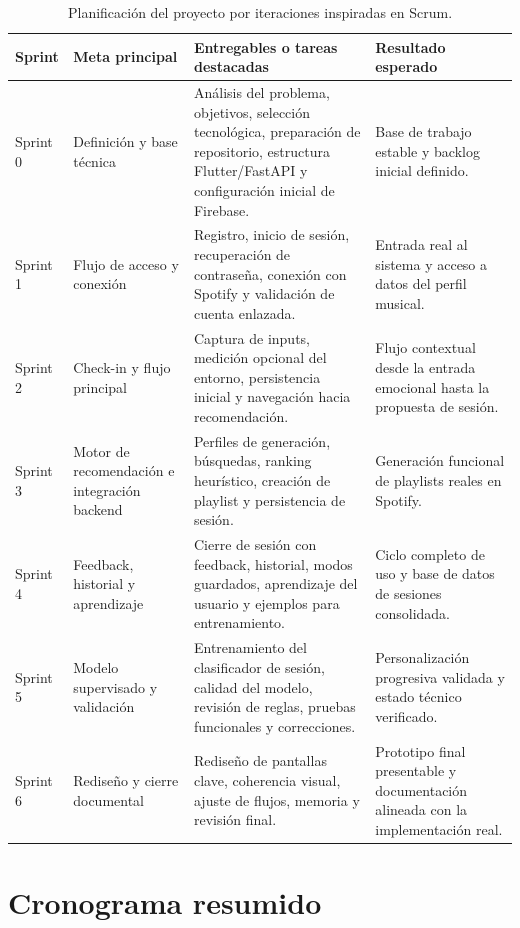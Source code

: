 \begin{table}[H]
\centering
\small
\renewcommand{\arraystretch}{1.1}
\begin{tabularx}{\textwidth}{|P{1.7cm}|P{2.4cm}|Y|P{2.7cm}|}
\hline
\textbf{Sprint} & \textbf{Meta principal} & \textbf{Entregables o tareas destacadas} & \textbf{Resultado esperado} \\
\hline
Sprint 0 & Definición y base técnica & Análisis del problema, objetivos, selección tecnológica, preparación de repositorio, estructura Flutter/FastAPI y configuración inicial de Firebase. & Base de trabajo estable y backlog inicial definido. \\
\hline
Sprint 1 & Flujo de acceso y conexión & Registro, inicio de sesión, recuperación de contraseña, conexión con Spotify y validación de cuenta enlazada. & Entrada real al sistema y acceso a datos del perfil musical. \\
\hline
Sprint 2 & Check-in y flujo principal & Captura de inputs, medición opcional del entorno, persistencia inicial y navegación hacia recomendación. & Flujo contextual desde la entrada emocional hasta la propuesta de sesión. \\
\hline
Sprint 3 & Motor de recomendación e integración backend & Perfiles de generación, búsquedas, ranking heurístico, creación de playlist y persistencia de sesión. & Generación funcional de playlists reales en Spotify. \\
\hline
Sprint 4 & Feedback, historial y aprendizaje & Cierre de sesión con feedback, historial, modos guardados, aprendizaje del usuario y ejemplos para entrenamiento. & Ciclo completo de uso y base de datos de sesiones consolidada. \\
\hline
Sprint 5 & Modelo supervisado y validación & Entrenamiento del clasificador de sesión, calidad del modelo, revisión de reglas, pruebas funcionales y correcciones. & Personalización progresiva validada y estado técnico verificado. \\
\hline
Sprint 6 & Rediseño y cierre documental & Rediseño de pantallas clave, coherencia visual, ajuste de flujos, memoria y revisión final. & Prototipo final presentable y documentación alineada con la implementación real. \\
\hline
\end{tabularx}
\caption{Planificación del proyecto por iteraciones inspiradas en Scrum.}
\label{tab:sprints_harmony_hub}
\end{table}

\section{Cronograma resumido}
\label{sec:cronograma}

